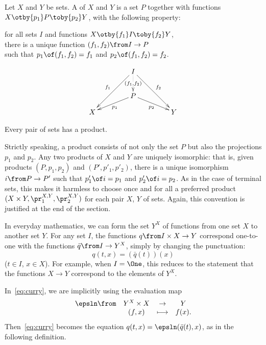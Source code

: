 \documentclass[12pt]{article}
\begin{document}
\begin{dfn}
Let $X$ and $Y$ be sets.  A  of $X$ and $Y$ is a set $P$
together with functions $X \otby{p_1} P \toby{p_2} Y$, with the following
property:
%  
\begin{defnprop}
for all sets $I$
and functions $X \otby{f_1} I \toby{f_2} Y$,\\
there is a unique function $(f_1, f_2)\from I \to P$\\
such that
$p_1 \of (f_1, f_2) = f_1$ and $p_2 \of (f_1, f_2) = f_2$.
\end{defnprop}
\end{dfn}
\[
\begin{xy}
(0,20)*+{I}="test";
(0,8)*+{P}="prod";
(-20,0)*+{X}="first";
(20,0)*+{Y}="second";
{\ar_{f_1} "test"; "first"};
{\ar^{f_2} "test"; "second"};
{\ar@{.>}|{(f_1, f_2)} "test"; "prod"};
{\ar^{p_1} "prod"; "first"};
{\ar_{p_2} "prod"; "second"};
\end{xy}
\]
% 
\begin{axiom}{5}
Every pair of sets has a product.
\end{axiom}

Strictly speaking, a product consists of not only the set $P$ but also the
projections $p_1$ and $p_2$.  Any two products of $X$ and $Y$ are uniquely
isomorphic: that is, given products $(P, p_1, p_2)$ and $(P', p'_1, p'_2)$,
there is a unique isomorphism $i\from P \to P'$ such that $p'_1 \of i =
p_1$ and $p'_2 \of i = p_2$.  As in the case of terminal sets, this makes
it harmless to choose once and for all a preferred product $(X \times Y,
\pr^{X, Y}_1, \pr^{X, Y}_2)$ for each pair $X$, $Y$ of sets.  Again, this
convention is justified at the end of the section.


% 
In everyday mathematics, we can form the set $Y^X$ of functions from one
set $X$ to another set $Y$.  For any set $I$, the functions $q \from I
\times X \to Y$ correspond one-to-one with the functions $\bar{q}\from I
\to Y^X$, simply by changing the punctuation:
% 
\begin{equation}        \label{eq:curry}
q(t, x)
=
(\bar{q}(t))(x)
\end{equation}
% 
($t \in I$, $x \in X$).  For example, when $I = \One$, this reduces to the
statement that the functions $X \to Y$ correspond to the elements of $Y^X$.

In~\eqref{eq:curry}, we are implicitly using the evaluation map
\[
\begin{array}{cccc}
\epsln\from     &Y^X \times X   &\to            &Y      \\
                &(f, x)         &\longmapsto    &f(x).
\end{array}
\]
Then~\eqref{eq:curry} becomes the equation $q(t, x) = \epsln (\bar{q}(t),
x)$, as in the following definition.
\end{document}
